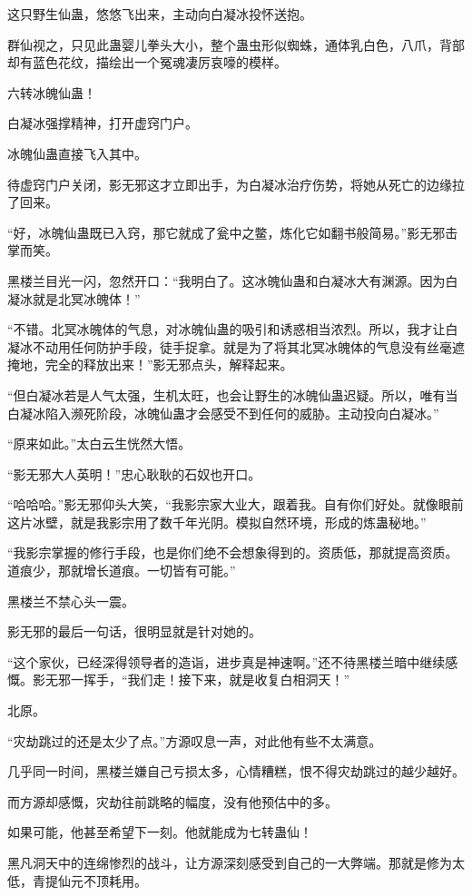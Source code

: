 \begin{this_body}
这只野生仙蛊，悠悠飞出来，主动向白凝冰投怀送抱。

群仙视之，只见此蛊婴儿拳头大小，整个蛊虫形似蜘蛛，通体乳白色，八爪，背部却有蓝色花纹，描绘出一个冤魂凄厉哀嚎的模样。

六转冰魄仙蛊！

白凝冰强撑精神，打开虚窍门户。

冰魄仙蛊直接飞入其中。

待虚窍门户关闭，影无邪这才立即出手，为白凝冰治疗伤势，将她从死亡的边缘拉了回来。

“好，冰魄仙蛊既已入窍，那它就成了瓮中之鳖，炼化它如翻书般简易。”影无邪击掌而笑。

黑楼兰目光一闪，忽然开口：“我明白了。这冰魄仙蛊和白凝冰大有渊源。因为白凝冰就是北冥冰魄体！”

“不错。北冥冰魄体的气息，对冰魄仙蛊的吸引和诱惑相当浓烈。所以，我才让白凝冰不动用任何防护手段，徒手捉拿。就是为了将其北冥冰魄体的气息没有丝毫遮掩地，完全的释放出来！”影无邪点头，解释起来。

“但白凝冰若是人气太强，生机太旺，也会让野生的冰魄仙蛊迟疑。所以，唯有当白凝冰陷入濒死阶段，冰魄仙蛊才会感受不到任何的威胁。主动投向白凝冰。”

“原来如此。”太白云生恍然大悟。

“影无邪大人英明！”忠心耿耿的石奴也开口。

“哈哈哈。”影无邪仰头大笑，“我影宗家大业大，跟着我。自有你们好处。就像眼前这片冰壁，就是我影宗用了数千年光阴。模拟自然环境，形成的炼蛊秘地。”

“我影宗掌握的修行手段，也是你们绝不会想象得到的。资质低，那就提高资质。道痕少，那就增长道痕。一切皆有可能。”

黑楼兰不禁心头一震。

影无邪的最后一句话，很明显就是针对她的。

“这个家伙，已经深得领导者的造诣，进步真是神速啊。”还不待黑楼兰暗中继续感慨。影无邪一挥手，“我们走！接下来，就是收复白相洞天！”

北原。

“灾劫跳过的还是太少了点。”方源叹息一声，对此他有些不太满意。

几乎同一时间，黑楼兰嫌自己亏损太多，心情糟糕，恨不得灾劫跳过的越少越好。

而方源却感慨，灾劫往前跳略的幅度，没有他预估中的多。

如果可能，他甚至希望下一刻。他就能成为七转蛊仙！

黑凡洞天中的连绵惨烈的战斗，让方源深刻感受到自己的一大弊端。那就是修为太低，青提仙元不顶耗用。


\end{this_body}
